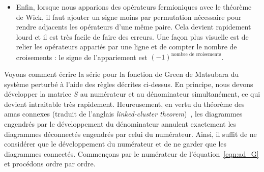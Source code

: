\begin{itemize}
    \begin{equation}
        \mathcal{G}^{(0)}_n(\tau) = -\left[\theta(\tau)(1-f_n)-\theta(-\tau)f_n\right]e^{-\xi_n\tau},\qquad \mathcal{G}^{(0)}_n(i\omega_j)=\frac{1}{i\omega_j-\xi_n},
        \label{eqn:G0}
    \end{equation}
    où $\theta$ est la fonction de Heaviside et où les fréquences de Matsubara fermioniques $\omega_j$ sont définies à l'équation~\eqref{eqn:G_tau}.
    \item Enfin, lorsque nous apparions des opérateurs fermioniques avec le théorème de Wick, il faut ajouter un signe moins par permutation nécessaire pour rendre adjacents les opérateurs d'une même paire. Cela devient rapidement lourd et il est très facile de faire des erreurs. Une façon plus visuelle est de relier les opérateurs appariés par une ligne et de compter le nombre de croisements : le signe de l'appariement est $(-1)^{\text{nombre de croisements}}$.
\end{itemize}

Voyons comment écrire la série pour la fonction de Green de Matsubara du système perturbé à l'aide des règles décrites ci-dessus. En principe, nous devons développer la matrice $S$ au numérateur et au dénominateur simultanément, ce qui devient intraitable très rapidement. Heureusement, en vertu du théorème des amas connexes (traduit de l'anglais \textit{linked-cluster theorem})~\cite{goldstoneDerivationBruecknerManyBody1957,blochDeterminationLetatFondamental1958}, les diagrammes engendrés par le développement du dénominateur annulent exactement les diagrammes déconnectés engendrés par celui du numérateur. Ainsi, il suffit de ne considérer que le développement du numérateur et de ne garder que les diagrammes connectés. Commençons par le numérateur de l'équation~\eqref{eqn:ad_G} et procédons ordre par ordre.

